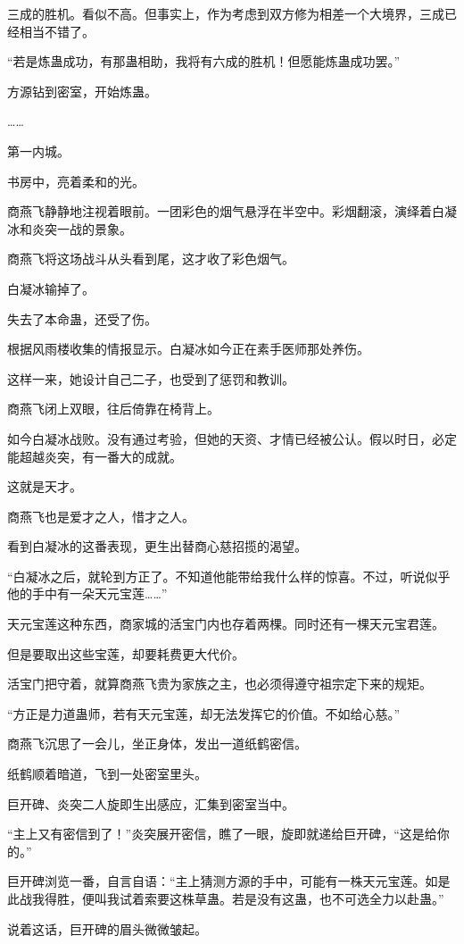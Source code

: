 \begin{this_body}
三成的胜机。看似不高。但事实上，作为考虑到双方修为相差一个大境界，三成已经相当不错了。

“若是炼蛊成功，有那蛊相助，我将有六成的胜机！但愿能炼蛊成功罢。”

方源钻到密室，开始炼蛊。

……

第一内城。

书房中，亮着柔和的光。

商燕飞静静地注视着眼前。一团彩色的烟气悬浮在半空中。彩烟翻滚，演绎着白凝冰和炎突一战的景象。

商燕飞将这场战斗从头看到尾，这才收了彩色烟气。

白凝冰输掉了。

失去了本命蛊，还受了伤。

根据风雨楼收集的情报显示。白凝冰如今正在素手医师那处养伤。

这样一来，她设计自己二子，也受到了惩罚和教训。

商燕飞闭上双眼，往后倚靠在椅背上。

如今白凝冰战败。没有通过考验，但她的天资、才情已经被公认。假以时日，必定能超越炎突，有一番大的成就。

这就是天才。

商燕飞也是爱才之人，惜才之人。

看到白凝冰的这番表现，更生出替商心慈招揽的渴望。

“白凝冰之后，就轮到方正了。不知道他能带给我什么样的惊喜。不过，听说似乎他的手中有一朵天元宝莲……”

天元宝莲这种东西，商家城的活宝门内也存着两棵。同时还有一棵天元宝君莲。

但是要取出这些宝莲，却要耗费更大代价。

活宝门把守着，就算商燕飞贵为家族之主，也必须得遵守祖宗定下来的规矩。

“方正是力道蛊师，若有天元宝莲，却无法发挥它的价值。不如给心慈。”

商燕飞沉思了一会儿，坐正身体，发出一道纸鹤密信。

纸鹤顺着暗道，飞到一处密室里头。

巨开碑、炎突二人旋即生出感应，汇集到密室当中。

“主上又有密信到了！”炎突展开密信，瞧了一眼，旋即就递给巨开碑，“这是给你的。”

巨开碑浏览一番，自言自语：“主上猜测方源的手中，可能有一株天元宝莲。如是此战我得胜，便叫我试着索要这株草蛊。若是没有这蛊，也不可选全力以赴蛊。”

说着这话，巨开碑的眉头微微皱起。


\end{this_body}
